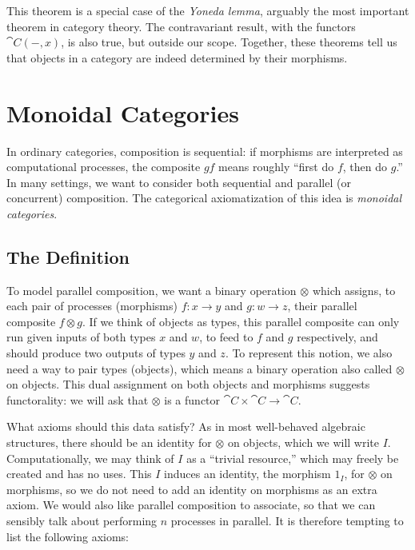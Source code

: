 This theorem is a special case of the \emph{Yoneda lemma}, arguably the most
important theorem in category theory. The contravariant result, with the
functors $\cat{C}(-, x)$, is also true, but outside our scope. Together, these
theorems tell us that objects in a category are indeed determined by their
morphisms.


\section{Monoidal Categories}

In ordinary categories, composition is sequential: if morphisms are interpreted
as computational processes, the composite $gf$ means roughly ``first do $f$,
then do $g$.'' In many settings, we want to consider both sequential and
parallel (or concurrent) composition. The categorical axiomatization of this idea is
\emph{monoidal categories}.

\subsection{The Definition}
\label{sec:monoidal definition}

To model parallel composition, we want a binary operation $\otimes$ which
assigns, to each pair of processes (morphisms) $f:x\to y$ and $g:w\to z$, their
parallel composite $f\otimes g$. If we think of objects as types, this parallel
composite can only run given inputs of both types $x$ and $w$, to feed to $f$
and $g$ respectively, and should produce two outputs of types $y$ and $z$. To
represent this notion, we also need a way to pair types (objects), which means a
binary operation also called $\otimes$ on objects. This dual assignment on
both objects and morphisms suggests functorality: we will ask that $\otimes$ is
a functor $\cat{C}\times\cat{C}\to\cat{C}$.

What axioms should this data satisfy? As in most well-behaved algebraic
structures, there should be an identity for $\otimes$ on objects, which we will
write $I$. Computationally, we may think of $I$ as a ``trivial resource,'' which
may freely be created and has no uses. This $I$ induces an identity, the
morphism $1_I$, for $\otimes$ on morphisms, so we do not need to add an identity
on morphisms as an extra axiom. We would also like parallel composition to
associate, so that we can sensibly talk about performing $n$ processes in
parallel. It is therefore tempting to list the following axioms:

